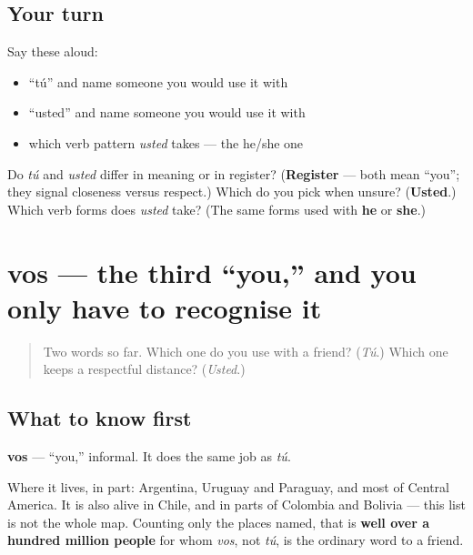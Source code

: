 \subsection*{Your turn}
Say these aloud:

\begin{itemize}
\raggedright
  \item \textquotedblleft{}tú\textquotedblright{} and name someone you would use it with
  \item \textquotedblleft{}usted\textquotedblright{} and name someone you would use it with
  \item which verb pattern \emph{usted} takes — the he/she one
\end{itemize}

\begin{tcolorbox}[breakable,colback=teal!4,colframe=teal!35!black,title={Before you move on}]
Do \emph{tú} and \emph{usted} differ in meaning or in register? (\textbf{Register} — both mean \textquotedblleft{}you\textquotedblright{}; they signal closeness versus respect.) Which do you pick when unsure? (\textbf{Usted}.) Which verb forms does \emph{usted} take? (The same forms used with \textbf{he} or \textbf{she}.)
\end{tcolorbox}
\section[vos]{vos — the third \textquotedblleft{}you,\textquotedblright{} and you only have to recognise it}

\label{lesson:ES-C03-vos}



\begin{quote}
Two words so far. Which one do you use with a friend? (\emph{Tú}.) Which one keeps a respectful distance? (\emph{Usted}.)
\end{quote}

\subsection*{What to know first}
\textbf{vos} — \textquotedblleft{}you,\textquotedblright{} informal. It does the same job as \emph{tú}.

Where it lives, in part: Argentina, Uruguay and Paraguay, and most of Central America. It is also alive in Chile, and in parts of Colombia and Bolivia — this list is not the whole map. Counting only the places named, that is \textbf{well over a hundred million people} for whom \emph{vos}, not \emph{tú}, is the ordinary word to a friend.

